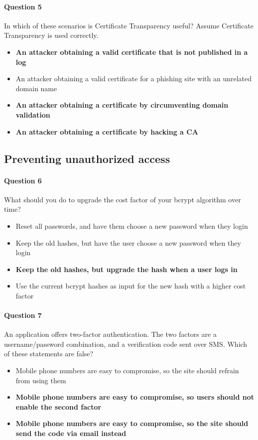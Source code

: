 \documentclass[titlepage]{article}
\begin{document}
    \paragraph{Question 5} In which of these scenarios is Certificate Transparency useful? Assume Certificate Transparency is used correctly.
    \begin{itemize}
        \item \textbf{An attacker obtaining a valid certificate that is not published in a log} \checkmark
        \item An attacker obtaining a valid certificate for a phishing site with an unrelated domain name
        \item \textbf{An attacker obtaining a certificate by circumventing domain validation} \checkmark
        \item \textbf{An attacker obtaining a certificate by hacking a CA} \checkmark
    \end{itemize}
    \subsection{Preventing unauthorized access}
    \paragraph{Question 6} What should you do to upgrade the cost factor of your bcrypt algorithm over time?
    \begin{itemize}
        \item Reset all passwords, and have them choose a new password when they login
        \item Keep the old hashes, but have the user choose a new password when they login
        \item \textbf{Keep the old hashes, but upgrade the hash when a user logs in} \checkmark
        \item Use the current bcrypt hashes as input for the new hash with a higher cost factor
    \end{itemize}
    \paragraph{Question 7} An application offers two-factor authentication. The two factors are a username/password combination, and a verification code sent over SMS. Which of these statements are false?
    \begin{itemize}
        \item Mobile phone numbers are easy to compromise, so the site should refrain from using them
        \item \textbf{Mobile phone numbers are easy to compromise, so users should not enable the second factor} \checkmark
        \item \textbf{Mobile phone numbers are easy to compromise, so the site should send the code via email instead} \checkmark
    \end{itemize}
\end{document}
